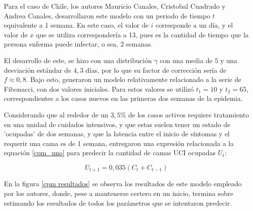 Para el caso de Chile, los autores Mauricio Canales, Cristobal Cuadrado y Andrea Canales, desarrollaron este modelo con un periodo de tiempo $t$ equivalente a 1 semana. En este caso, el valor de $i$ corresponde a un día, y el valor de $x$ que se utiliza correspondería a 13, pues es la cantidad de tiempo que la persona enferma puede infectar, o sea, 2 semanas.

El desarrollo de este, se hizo con una distribución $\gamma$ con una media de 5 y una desviación estándar de $4,3$ días, por lo que su factor de corrección sería de $f \approx 0,8$. Bajo esto, generaron un modelo relativamente relacionado a la serie de Fibonacci, con dos valores iniciales. Para estos valores se utilizó $t_1 = 10$ y $t_2 = 65$, correspondientes a los casos nuevos en las primeras dos semanas de la epidemia.

Considerando que al rededor de un $3,5\%$ de los casos activos requiere tratamiento en una unidad de cuidados intensivos, y que estas suelen tener un estado de 'ocupadas' de dos semanas, y que la latencia entre el inicio de síntomas y el requerir una cama es de 1 semana, entregaron una expresión relacionada a la equación \eqref{cpm_uno} para predecir la cantidad de camas UCI ocupadas $U_t$:

\begin{equation}
    U_{t+1} = 0,035 (C_t + C_{t-1})
\end{equation}

En la figura \ref{cpm resultados} se observa los resultados de este modelo empleado por los autores, donde, pese a mantenerse certero en un inicio, termina sobre estimando los resultados de todos los parámetros que se intentaron predecir.